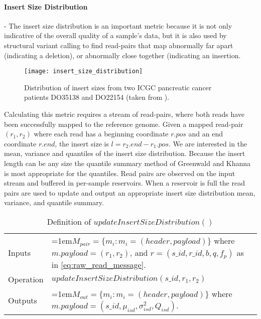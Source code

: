 \paragraph{Insert Size Distribution} - The insert size distribution is an important metric because it is not only indicative of the overall quality of a sample's data, but it is also used by structural variant calling to find read-pairs that map abnormally far apart (indicating a deletion), or abnormally close together (indicating an insertion. 

\begin{figure}[H]
    \texttt{[image: insert\_size\_distribution]}
    \centering
    \caption {Distribution of insert sizes from two ICGC pancreatic cancer patients DO35138 and DO22154 (taken from \autocite{stephens2016simulating}).}
    \label{fig:insert_size_distribution}
\end{figure} 

Calculating this metric requires a stream of read-pairs, where both reads have been successfully mapped to the reference genome. Given a mapped read-pair $(r_1,r_2)$ where each read has a beginning coordinate $r.pos$ and an end coordinate $r.end$, the insert size is $l = r_2.end - r_1.pos$. We are interested in the mean, variance and quantiles of the insert size distribution. Because the insert length can be any size the quantile summary method of Greenwald and Khanna\autocite{greenwald2001space} is most appropriate for the quantiles. Read pairs are observed on the input stream and buffered in per-sample reservoirs. When a reservoir is full the read pairs are used to update and output an appropriate insert size distribution mean, variance, and quantile summary.

\bgroup
\def\arraystretch{1.5}
\begin{table}[!ht]
    \caption{Definition of $updateInsertSizeDistribution()$}
    \label{tab:op_update_insert_size_dist}
    {\begin{tabular}{l|p{12cm}}
    \toprule
    Inputs & \hangindent=1em$M_{pair} = \{m_i: m_i = (header, payload)\}$ where $m.payload = (r_1,r_2)$, and $r = (s\_id, r\_id, b, q, f_p)$ as in \ref{eq:raw_read_message}. \\
    \cline{2-2}
    Operation & $updateInsertSizeDistribution(s\_id,r_1, r_2)$\\
    \cline{2-2}
    {Outputs} & \hangindent=1em$M_{out} = \{m_i: m_i = (header, payload)\}$ where $m.payload = (s\_id, \mu_{isd}, \sigma_{isd}^2, Q_{isd})$.\\
    \bottomrule
    \end{tabular}}
\end{table}
\egroup

